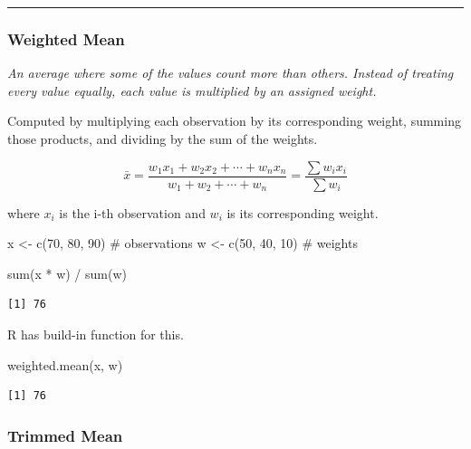 \documentclass[
  letterpaper,
  DIV=11,
  numbers=noendperiod]{scrartcl}
\newenvironment{Shaded}{\begin{snugshade}}{\end{snugshade}}
\newcommand{\CommentTok}[1]{\textcolor[rgb]{0.37,0.37,0.37}{#1}}
\newcommand{\DecValTok}[1]{\textcolor[rgb]{0.68,0.00,0.00}{#1}}
\newcommand{\FunctionTok}[1]{\textcolor[rgb]{0.28,0.35,0.67}{#1}}
\newcommand{\NormalTok}[1]{\textcolor[rgb]{0.00,0.23,0.31}{#1}}
\newcommand{\OtherTok}[1]{\textcolor[rgb]{0.00,0.23,0.31}{#1}}
\newcommand{\SpecialCharTok}[1]{\textcolor[rgb]{0.37,0.37,0.37}{#1}}
\begin{document}
\begin{center}\rule{0.5\linewidth}{0.5pt}\end{center}

\subsubsection{Weighted Mean}\label{weighted-mean}

\emph{An average where some of the values count more than others.
Instead of treating every value equally, each value is multiplied by an
assigned weight.}

Computed by multiplying each observation by its corresponding weight,
summing those products, and dividing by the sum of the weights.

\[\bar{x}= \frac{w_1 x_1 + w_2 x_2 + \cdots + w_n x_n}       {w_1 + w_2 + \cdots + w_n}= \frac{\sum w_i x_i}{\sum w_i}\]

where \(x_i\) is the i-th observation and \(w_i\) is its corresponding
weight.

\begin{Shaded}
\begin{Highlighting}[]
\NormalTok{x }\OtherTok{\textless{}{-}} \FunctionTok{c}\NormalTok{(}\DecValTok{70}\NormalTok{, }\DecValTok{80}\NormalTok{, }\DecValTok{90}\NormalTok{) }\CommentTok{\# observations}
\NormalTok{w }\OtherTok{\textless{}{-}} \FunctionTok{c}\NormalTok{(}\DecValTok{50}\NormalTok{, }\DecValTok{40}\NormalTok{, }\DecValTok{10}\NormalTok{)  }\CommentTok{\# weights}

\FunctionTok{sum}\NormalTok{(x }\SpecialCharTok{*}\NormalTok{ w) }\SpecialCharTok{/} \FunctionTok{sum}\NormalTok{(w)}
\end{Highlighting}
\end{Shaded}

\begin{verbatim}
[1] 76
\end{verbatim}

R has build-in function for this.

\begin{Shaded}
\begin{Highlighting}[]
\FunctionTok{weighted.mean}\NormalTok{(x, w)}
\end{Highlighting}
\end{Shaded}

\begin{verbatim}
[1] 76
\end{verbatim}

\subsubsection{Trimmed Mean}\label{trimmed-mean}
\end{document}
